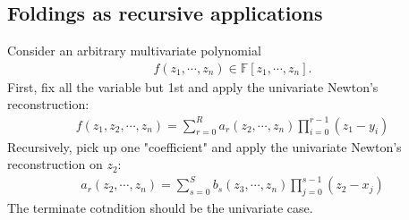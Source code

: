 \documentclass[11pt]{book}
\begin{document}
\subsection{Foldings as recursive applications}
Consider an arbitrary multivariate polynomial
\begin{eqnarray}
f(z_1,\cdots, z_n) \in \mathbb{F}[z_1,\cdots, z_n].
\end{eqnarray}
First, fix all the variable but 1st and apply the univariate Newton's reconstruction:
\begin{eqnarray}
f(z_1, z_2, \cdots, z_n) = \sum_{r=0}^R a_r (z_2,\cdots, z_n) \prod_{i=0}^{r-1}(z_1 - y_i)
\end{eqnarray}
Recursively, pick up one "coefficient" and apply the univariate Newton's reconstruction on $z_2$:
\begin{eqnarray}
a_r(z_2, \cdots, z_n) = \sum_{s=0}^{S} b_s (z_3,\cdots, z_n) \prod_{j=0}^{s-1}(z_2 - x_j)
\end{eqnarray}
The terminate cotndition should be the univariate case.
\end{document}
